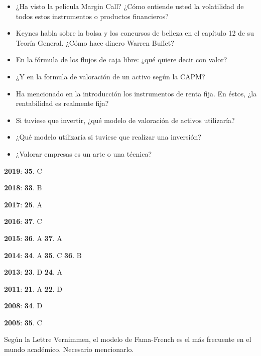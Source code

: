 \documentclass{nuevotema}
\begin{document}
\begin{itemize}
    \item ¿Ha visto la película Margin Call? ¿Cómo entiende usted la volatilidad de todos estos instrumentos o productos financieros?
    \item Keynes habla sobre la bolsa y los concursos de belleza en el capítulo 12 de su Teoría General. ¿Cómo hace dinero Warren Buffet?
    \item En la fórmula de los flujos de caja libre: ¿qué quiere decir con valor?
    \item ¿Y en la formula de valoración de un activo según la CAPM? 
    \item Ha mencionado en la introducción los instrumentos de renta fija. En éstos, ¿la rentabilidad es realmente fija?
\end{itemize}

\begin{itemize}
    \item Si tuviese que invertir, ¿qué modelo de valoración de activos utilizaría?
\end{itemize}

\begin{itemize}
    \item ¿Qué modelo utilizaría si tuviese que realizar una inversión?
    \item ¿Valorar empresas es un arte o una técnica?
\end{itemize}

\notas

\textbf{2019}: \textbf{35}. C

\textbf{2018}: \textbf{33}. B
 
\textbf{2017}: \textbf{25}. A

\textbf{2016}: \textbf{37}. C

\textbf{2015}: \textbf{36}. A \textbf{37}. A

\textbf{2014}: \textbf{34}. A \textbf{35}. C \textbf{36}. B

\textbf{2013}: \textbf{23}. D \textbf{24}. A

\textbf{2011}: \textbf{21}. A \textbf{22}. D

\textbf{2008}: \textbf{34}. D

\textbf{2005}: \textbf{35}. C

Según la Lettre Vernimmen, el modelo de Fama-French es el más frecuente en el mundo académico. Necesario mencionarlo.


\bibliografia
\end{document}
